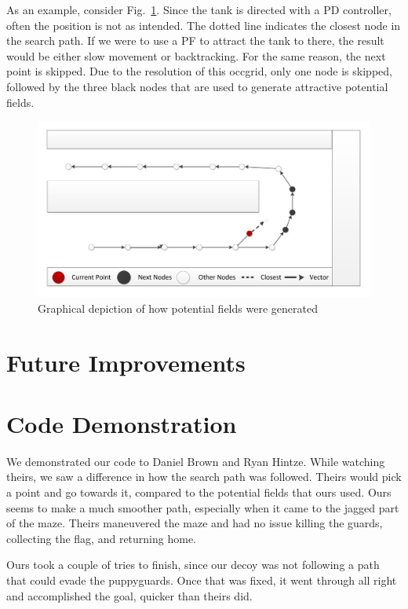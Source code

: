 \documentclass{article}
\begin{document}
As an example, consider Fig.~\ref{fig:graph_pf_generator}.  Since the tank is directed with a PD controller, often the position is not as intended.  The dotted line indicates the closest node in the search path.  If we were to use a PF to attract the tank to there, the result would be either slow movement or backtracking.  For the same reason, the next point is skipped.  Due to the resolution of this occgrid, only one node is skipped, followed by the three black nodes that are used to generate attractive potential fields.

\begin{figure}[h!tb]
	\label{fig:graph_pf_generator}
	\begin{center}
	\includegraphics[width=.4\textwidth,page=1]{graphics/drawing}
	\end{center}
	\caption{Graphical depiction of how potential fields were generated}
\end{figure}

\section{Future Improvements}

\section{Code Demonstration}
We demonstrated our code to Daniel Brown and Ryan Hintze. While watching theirs, we saw a difference in how the search path was followed.  Theirs would pick a point and go towards it, compared to the potential fields that ours used.  Ours seems to make a much smoother path, especially when it came to the jagged part of the maze. Theirs maneuvered the maze and had no issue killing the guards, collecting the flag, and returning home.

Ours took a couple of tries to finish, since our decoy was not following a path that could evade the puppyguards.  Once that was fixed, it went through all right and accomplished the goal, quicker than theirs did.

\newpage
\end{document}
